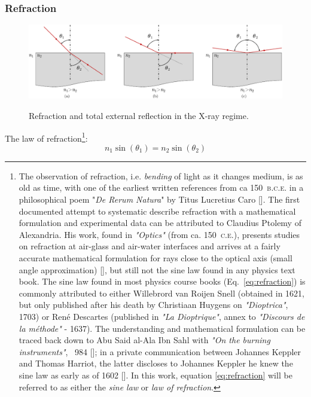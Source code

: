 \begin{refsection}
\subsubsection*{Refraction}

\begin{figure}[t]
    \centering
    {\includegraphics[width=0.7\linewidth]{figures/ch03/reflection_refraction.pdf}}
    \caption[Refraction and total external reflection in the X-ray regime]{Refraction and total external reflection in the X-ray regime.}
    \label{fig:reflection_refraction}
\end{figure}

The law of refraction\footnote{The observation of refraction, i.e. \textit{bending} of light as it changes medium, is as old as time, with one of the earliest written references from ca 150~\textsc{b.c.e.} in a philosophical poem "\textit{De Rerum Natura}" by Titus Lucretius Caro [\cite{Wilk2004}]. The first documented attempt to systematic describe refraction with a mathematical formulation and experimental data can be attributed to Claudius Ptolemy of Alexandria. His work, found in \textit{"Optics"} (from ca. 150~\textsc{c.e.}), presents studies on refraction at air-glass and air-water interfaces and arrives at a fairly accurate mathematical formulation for rays close to the optical axis (small angle approximation) [\cite{Kwan2002}], but still not the sine law found in any physics text book. The sine law found in most physics course books (Eq.~\ref{eq:refraction}) is commonly attributed to either Willebrord van Roijen Snell (obtained in 1621, but only published after his death by Christiaan Huygens on \textit{"Dioptrica"}, 1703) or Ren\'{e} Descartes (published in \textit{"La Dioptrique"}, annex to \textit{"Discours de la m\'{e}thode"} - 1637). The understanding and mathematical formulation can be traced back down to Abu Said al-Ala Ibn Sahl with \textit{"On the burning instruments"}, ~984 [\cite{Rashed1990}]; in a private communication between Johannes Keppler and Thomas Harriot, the latter discloses to Johannes Keppler he knew the sine law as early as of 1602 [\cite{Kwan2002,Lohne1956}]. In this work, equation \ref{eq:refraction} will be referred to as either the \textit{sine law} or \textit{law of refraction}.}:
\begin{equation}\label{eq:refraction}
    n_1\sin(\theta_1)= n_2\sin(\theta_2)
\end{equation}


\end{refsection}
